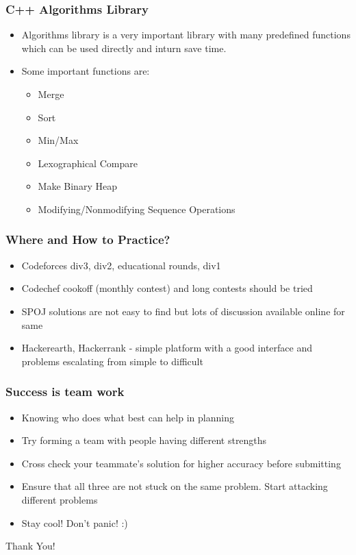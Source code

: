 \documentclass{beamer}
\begin{document}
\begin{frame}
\frametitle{C++ Algorithms Library}
\begin{itemize}
\item Algorithms library is a very important library with many predefined functions which can be used directly and inturn save time.
\item Some important functions are:
\begin{itemize}
\item Merge
\item Sort
\item Min/Max
\item Lexographical Compare
\item Make Binary Heap
\item Modifying/Nonmodifying Sequence Operations
\end{itemize}
\end{itemize}
\end{frame}





\begin{frame}
\frametitle{Where and How to Practice?}
\begin{itemize}
\item Codeforces div3, div2, educational rounds, div1
\item Codechef cookoff (monthly contest) and long contests should be tried
\item SPOJ solutions are not easy to find but lots of discussion available online for same
\item Hackerearth, Hackerrank - simple platform with a good interface and problems escalating from simple to difficult
\end{itemize}
\end{frame}

\begin{frame}
\frametitle{Success is team work}
\begin{itemize}
\item Knowing who does what best can help in planning
\item Try forming a team with people having different strengths
\item Cross check your teammate’s solution for higher accuracy before submitting
\item Ensure that all three are not stuck on the same problem. Start attacking different problems
\item Stay cool! Don’t panic! :)
\end{itemize}
\end{frame}



\begin{frame}
\Huge{\centerline{Thank You!}}
\end{frame}

\end{document}
